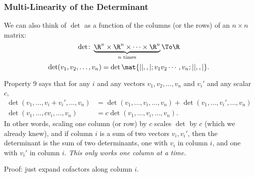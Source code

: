 \begin{frame}
\begin{center}
\end{center}

\end{frame}



\begin{frame}
\frametitle{Multi-Linearity of the Determinant}

We can also think of $\det$ as a function of the columns (or the rows) of an
$n\times n$ matrix:
\[ \det\colon\underbrace{\R^n\times\R^n\times\cdots\times\R^n}_{\text{$n$ times}}
\To\R \]
\[ \det(v_1,v_2,\ldots,v_n) = \det\mat{| | ,, |; v_1 v_2 \cdots, v_n; | | ,, |}. \]

\pause
\alert{Property 9} says that for any $i$ and any vectors $v_1,v_2,\ldots,v_n$
and $v_i'$ and any scalar $c$,
\[\begin{split} \det(v_1,\ldots,v_i+v_i',\ldots,v_n) &=
\det(v_1,\ldots,v_i,\ldots,v_n) + \det(v_1,\ldots,v_i',\ldots,v_n) \\
\det(v_1,\ldots,cv_i,\ldots,v_n) &= c\det(v_1,\ldots,v_i,\ldots,v_n).
\end{split}\]
\pause
In other words, scaling one column (or row) by $c$ scales $\det$ by $c$ (which
we already knew), 
\pause
and if column $i$ is a sum of two vectors $v_i,v_i'$, then the
determinant is the sum of two determinants, one with $v_i$ in column $i$, and
one with $v_i'$ in column $i$.  
\pause
\emph{\color{red}This only works one column at a time.}

\pause\bigskip
\alert{Proof:} just expand cofactors along column $i$.

\end{frame}



